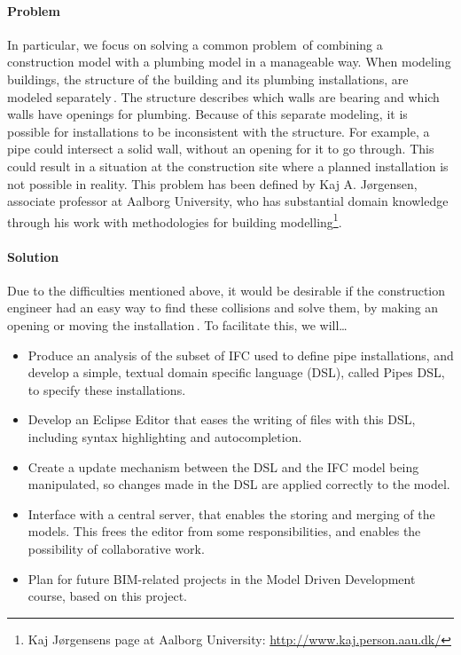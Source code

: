 \paragraph{Problem}
In particular, we focus on solving a common problem\,\cite[pp. 20]{jorgensen10} of combining a construction model with a plumbing model in a manageable way. When modeling buildings, the structure of the building and its plumbing installations, are modeled separately\,\cite[pp. 19--20]{jorgensen10}. The structure describes which walls are bearing and which walls have openings for plumbing.  Because of this separate modeling, it is possible for installations to be inconsistent with the structure. For example, a pipe could intersect a solid wall, without an opening for it to go through. This could result in a situation at the construction site where a planned installation is not possible in reality. This problem has been defined by Kaj A. Jørgensen, associate professor at Aalborg University, who has substantial domain knowledge through his work with methodologies for building modelling\footnote{Kaj Jørgensens page at Aalborg University: \url{http://www.kaj.person.aau.dk/}}.

\paragraph{Solution}
Due to the difficulties mentioned above, it would be desirable if the construction engineer had an easy way to find these collisions and solve them, by making an opening or moving the installation\,\cite{jorgensen12}. To facilitate this, we will…
\begin{itemize}
\item Produce an analysis of the subset of IFC used to define pipe installations, and develop a simple, textual domain specific language (DSL), called Pipes DSL, to specify these installations.
\item Develop an Eclipse Editor that eases the writing of files with this DSL, including syntax highlighting and autocompletion.
\item Create a update mechanism between the DSL and the IFC model being manipulated, so changes made in the DSL are applied correctly to the model.
\item Interface with a central server, that enables the storing and merging of the models. This frees the editor from some responsibilities, and enables the possibility of collaborative work.
\item Plan for future BIM-related projects in the Model Driven Development course, based on this project.
\end{itemize}

